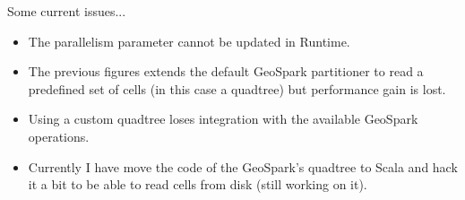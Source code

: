 \documentclass{beamer}
\begin{document}
\begin{frame}{Some current issues...}
    \begin{itemize}
        \item The parallelism parameter cannot be updated in Runtime.
        \item The previous figures extends the default GeoSpark partitioner to read a predefined set of cells (in this case a quadtree) but performance gain is lost.
        \item Using a custom quadtree loses integration with the available GeoSpark operations.
        \item Currently I have move the code of the GeoSpark's quadtree to Scala and hack it a bit to be able to read cells from disk (still working on it).
    \end{itemize}

\end{frame}
\end{document}
